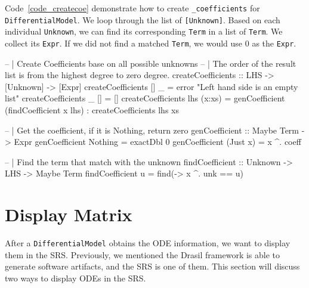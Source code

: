 Code~\ref{code_createcoe} demonstrate how to create \verb|_coefficients| for \verb|DifferentialModel|. We loop through the list of \verb|[Unknown]|. Based on each individual \verb|Unknown|, we can find its corresponding \verb|Term| in a list of \verb|Term|. We collect its \verb|Expr|. If we did not find a matched \verb|Term|, we would use 0 as the \verb|Expr|.

\begin{listing}[ht]
\begin{haskell1}
-- | Create Coefficients base on all possible unknowns
-- | The order of the result list is from the highest degree to zero degree.
createCoefficients :: LHS -> [Unknown] -> [Expr]
createCoefficients [] _ = error "Left hand side is an empty list"
createCoefficients _ [] = []
createCoefficients lhs (x:xs) = genCoefficient (findCoefficient x lhs) : createCoefficients lhs xs

-- | Get the coefficient, if it is Nothing, return zero
genCoefficient :: Maybe Term -> Expr
genCoefficient Nothing = exactDbl 0
genCoefficient (Just x) = x ^. coeff

-- | Find the term that match with the unknown
findCoefficient :: Unknown -> LHS -> Maybe Term
findCoefficient u = find(\x -> x ^. unk == u)
\end{haskell1}
\label{code_createcoe}
\end{listing}

\section{Display Matrix}
After a \verb|DifferentialModel| obtains the ODE information, we want to display them in the SRS. Previously, we mentioned the Drasil framework is able to generate software artifacts, and the SRS is one of them. This section will discuss two ways to display ODEs in the SRS.

